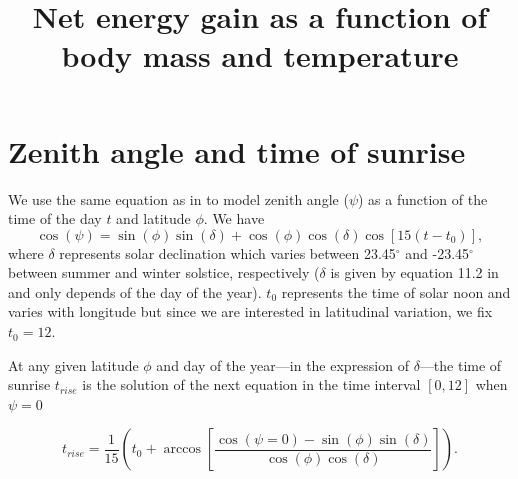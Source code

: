 \documentclass[12pt]{article}
\date{\vspace{-5ex}}
\begin{document}
\maketitle

\title{Net energy gain as a function of body mass and temperature}

\section{Zenith angle and time of sunrise}
We use the same equation as in \citet{Campbell2012} to model zenith angle ($\psi$) as a function of the time of the day $t$ and latitude $\phi$.
We have
\begin{equation}  \label{eq:psi}
\cos(\psi) = \sin(\phi) \sin(\delta) + \cos(\phi) \cos(\delta) \cos[15 (t- t_0)],
\end{equation}
where $\delta$ represents solar declination which varies between 23.45$^\circ$ and  -23.45$^\circ$ between summer and winter solstice, respectively ($\delta$ is given by equation 11.2 in \citet{Campbell2012} and only depends of the day of the year).
$t_0$ represents the time of solar noon and varies with longitude but since we are interested in latitudinal variation, we fix $t_0 = 12$.

At any given latitude $\phi$ and day of the year---in the expression of $\delta$---the time of sunrise $t_{rise}$ is the solution of the next equation in the time interval $[0,12]$ when $\psi = 0$

\begin{equation}
t_{rise} =  \frac{1}{15} \left( t_0 +  \arccos \left[ \frac{\cos(\psi = 0) - \sin(\phi) \sin(\delta)}{\cos(\phi) \cos(\delta)} \right] \right).
\end{equation}


\end{document}
